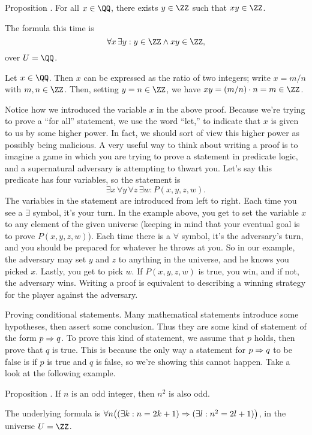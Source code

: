 \proclaim Proposition \advthm. For all $x\in \QQ$, there exists $y\in \ZZ$ such that
$xy \in \ZZ$.

\noindent The formula this time is
$$\forall x\, \exists y : y\in \ZZ \wedge xy\in \ZZ,$$
over $U = \QQ$.

\proof Let $x \in \QQ$. Then $x$ can be expressed as the ratio of two integers; write $x = m/n$ with
$m,n\in \ZZ$. Then, setting $y=n\in \ZZ$, we have $xy = (m/n)\cdot n = m\in \ZZ$.\slug

Notice how we introduced the variable $x$ in the above proof.
Because we're trying to prove a ``for all'' statement, we use
the word ``let,'' to indicate that $x$ is given to us by some higher power. In fact, we should sort
of view this higher power as possibly being malicious. A very useful way to think about writing a proof is
to imagine a game in which you are trying to prove a statement in predicate logic, and a supernatural adversary
is attempting to thwart you. Let's say this predicate has four variables, so the statement is
$$\exists x \, \forall y \, \forall z\, \exists w : P(x,y,z,w).$$
The variables in the statement are introduced from left to right. Each time you see a $\exists$
symbol, it's your turn. In the example above, you get to set the variable $x$ to any element of the
given universe (keeping in mind that your eventual goal is to prove $P(x,y,z,w)$). Each time there
is a $\forall$ symbol, it's the adversary's turn, and you should be prepared for whatever he throws at you.
So in our example, the adversary may set $y$ and $z$ to anything in the universe, and he knows you picked
$x$. Lastly, you get to pick $w$. If $P(x,y,z,w)$ is true, you win, and if not, the adversary wins.
Writing a proof is equivalent to describing a winning strategy for the player against the adversary.

\medskip\noindent\boldlabel{} Proving conditional statements.
Many mathematical statements introduce some hypotheses, then assert some conclusion. Thus they are some
kind of statement of the form $p\Rightarrow q$. To prove this kind of statement,
we assume that $p$ holds, then prove that $q$ is true. This is because the only way a statement for $p\Rightarrow q$
to be false is if $p$ is true and $q$ is false, so we're showing this cannot happen. Take a look at
the following example.

\edef\propoddimpliessquareodd{\the\thmcount}
\proclaim Proposition \advthm. If $n$ is an odd integer, then $n^2$ is also odd.

\noindent
The underlying formula is $\forall n\bigl( (\exists k : n= 2k+1) \Rightarrow (\exists l : n^2 = 2l+1)\bigr)$,
in the universe $U=\ZZ$.

